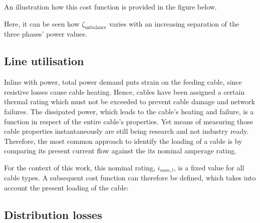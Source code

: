 

An illustration how this cost function is provided in the figure below.



Here, it can be seen how $\zeta_\text{unbalance}$ varies with an increasing separation of the three phases' power values.

\subsection{Line utilisation}
\label{ch1:subsec:line-utilisation}

Inline with power, total power demand puts strain on the feeding cable, since resistive losses cause cable heating.
Hence, cables have been assigned a certain thermal rating which must not be exceeded to prevent cable damage and network failures.
The dissipated power, which leads to the cable's heating and failure, is a function in respect of the entire cable's properties.
Yet means of measuring those cable properties instantaneously are still being research and not industry ready.
Therefore, the most common approach to identify the loading of a cable is by comparing its present current flow against the its nominal amperage rating.

For the context of this work, this nominal rating, $i_{nom,l}$, is a fixed value for all cable types.
A subsequent cost function can therefore be defined, which takes into account the present loading of the cable:



\subsection{Distribution losses}
\label{ch1:subsec:losses}






